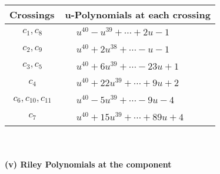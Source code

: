 \documentclass[1p]{elsarticle_modified}
\theoremstyle{definition}
\begin{document}
\begin{tabular}{m{50pt}|m{274pt}}
Crossings & \hspace{64pt}u-Polynomials at each crossing \\
\hline $$\begin{aligned}c_{1},c_{8}\end{aligned}$$&$\begin{aligned}
&u^{40}- u^{39}+\cdots+2 u-1
\end{aligned}$\\
\hline $$\begin{aligned}c_{2},c_{9}\end{aligned}$$&$\begin{aligned}
&u^{40}+2 u^{38}+\cdots- u-1
\end{aligned}$\\
\hline $$\begin{aligned}c_{3},c_{5}\end{aligned}$$&$\begin{aligned}
&u^{40}+6 u^{39}+\cdots-23 u+1
\end{aligned}$\\
\hline $$\begin{aligned}c_{4}\end{aligned}$$&$\begin{aligned}
&u^{40}+22 u^{39}+\cdots+9 u+2
\end{aligned}$\\
\hline $$\begin{aligned}c_{6},c_{10},c_{11}\end{aligned}$$&$\begin{aligned}
&u^{40}-5 u^{39}+\cdots-9 u-4
\end{aligned}$\\
\hline $$\begin{aligned}c_{7}\end{aligned}$$&$\begin{aligned}
&u^{40}+15 u^{39}+\cdots+89 u+4
\end{aligned}$\\
\hline
\end{tabular}\\~\\
\newpage\renewcommand{\arraystretch}{1}
\flushleft \textbf{(v) Riley Polynomials at the component}\newline \\
\end{document}
